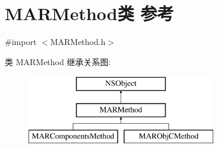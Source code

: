 \hypertarget{interface_m_a_r_method}{}\section{M\+A\+R\+Method类 参考}
\label{interface_m_a_r_method}


{\ttfamily \#import $<$M\+A\+R\+Method.\+h$>$}

类 M\+A\+R\+Method 继承关系图\+:\begin{figure}[H]
\begin{center}
\leavevmode
\includegraphics[height=3.000000cm]{interface_m_a_r_method}
\end{center}
\end{figure}
